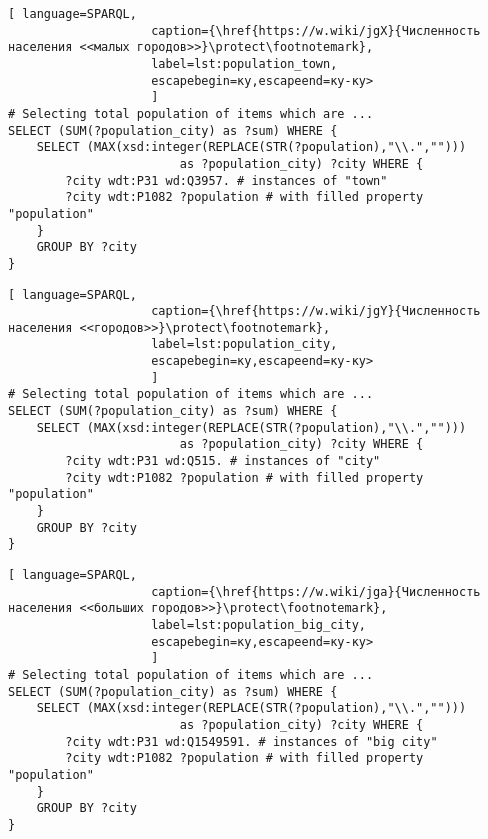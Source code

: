 \begin{lstlisting}[ language=SPARQL, 
                    caption={\href{https://w.wiki/jgX}{Численность населения <<малых городов>>}\protect\footnotemark},
                    label=lst:population_town, 
                    escapebegin=ку,escapeend=ку-ку>
                    ]
# Selecting total population of items which are ...
SELECT (SUM(?population_city) as ?sum) WHERE {                    
	SELECT (MAX(xsd:integer(REPLACE(STR(?population),"\\.",""))) 
						as ?population_city) ?city WHERE {
		?city wdt:P31 wd:Q3957.	# instances of "town"
		?city wdt:P1082 ?population # with filled property "population"                                  
	}
	GROUP BY ?city
}
\end{lstlisting}

\begin{lstlisting}[ language=SPARQL, 
                    caption={\href{https://w.wiki/jgY}{Численность населения <<городов>>}\protect\footnotemark},
                    label=lst:population_city, 
                    escapebegin=ку,escapeend=ку-ку>
                    ]
# Selecting total population of items which are ...
SELECT (SUM(?population_city) as ?sum) WHERE {                    
	SELECT (MAX(xsd:integer(REPLACE(STR(?population),"\\.",""))) 
						as ?population_city) ?city WHERE {
		?city wdt:P31 wd:Q515. # instances of "city"
		?city wdt:P1082 ?population # with filled property "population"
	}
	GROUP BY ?city
}\end{lstlisting}

\begin{lstlisting}[ language=SPARQL, 
                    caption={\href{https://w.wiki/jga}{Численность населения <<больших городов>>}\protect\footnotemark},
                    label=lst:population_big_city, 
                    escapebegin=ку,escapeend=ку-ку>
                    ]
# Selecting total population of items which are ...
SELECT (SUM(?population_city) as ?sum) WHERE {                    
	SELECT (MAX(xsd:integer(REPLACE(STR(?population),"\\.",""))) 
						as ?population_city) ?city WHERE {
		?city wdt:P31 wd:Q1549591. # instances of "big city"
		?city wdt:P1082 ?population # with filled property "population"
	}
	GROUP BY ?city
}
\end{lstlisting}

